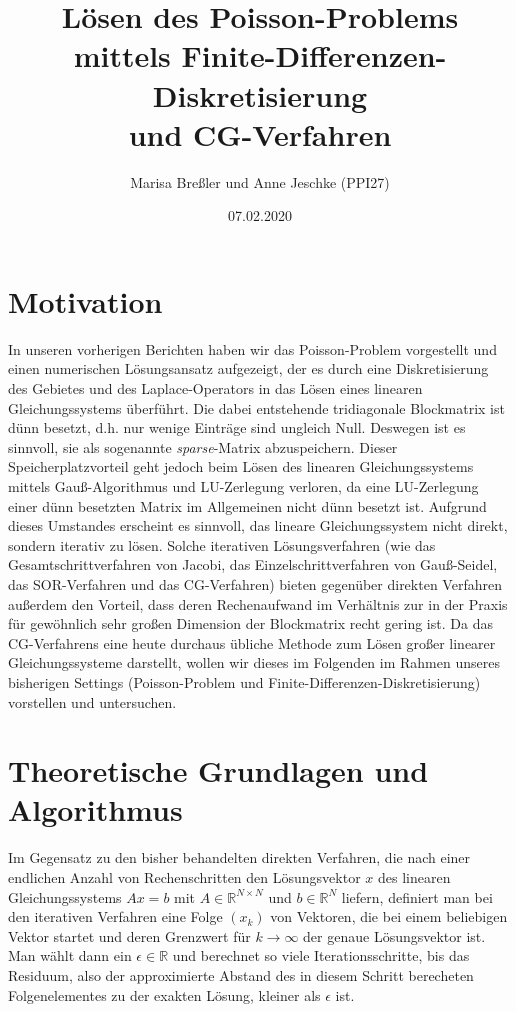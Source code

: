\documentclass{scrartcl}
\begin{document}
\title{Lösen des Poisson-Problems mittels Finite-Differenzen-Diskretisierung\\
und CG-Verfahren}
\author{Marisa Breßler und Anne Jeschke (PPI27)}
\date{07.02.2020}
\maketitle

\tableofcontents

\pagebreak
\section{Motivation}
In unseren vorherigen Berichten haben wir das Poisson-Problem vorgestellt und einen numerischen Lösungsansatz aufgezeigt, der es durch eine Diskretisierung des Gebietes und des Laplace-Operators in das Lösen eines linearen Gleichungssystems überführt.
Die dabei entstehende tridiagonale Blockmatrix ist dünn besetzt, d.h. nur wenige Einträge sind ungleich Null.
Deswegen ist es sinnvoll, sie als sogenannte \textit{sparse}-Matrix abzuspeichern.
Dieser Speicherplatzvorteil geht jedoch beim Lösen des linearen Gleichungssystems mittels Gauß-Algorithmus und LU-Zerlegung verloren, da eine LU-Zerlegung einer dünn besetzten Matrix im Allgemeinen nicht dünn besetzt ist.
Aufgrund dieses Umstandes erscheint es sinnvoll, das lineare Gleichungssystem nicht direkt, sondern iterativ zu lösen.
Solche iterativen Lösungsverfahren (wie das Gesamtschrittverfahren von Jacobi, das Einzelschrittverfahren von Gauß-Seidel, das SOR-Verfahren und das CG-Verfahren) bieten gegenüber direkten Verfahren außerdem den Vorteil, dass deren Rechenaufwand im Verhältnis zur in der Praxis für gewöhnlich sehr großen Dimension der Blockmatrix recht gering ist.
Da das CG-Verfahrens eine heute durchaus übliche Methode zum Lösen großer linearer Gleichungssysteme darstellt, wollen wir dieses im Folgenden im Rahmen unseres bisherigen Settings (Poisson-Problem und Finite-Differenzen-Diskretisierung) vorstellen und untersuchen.



\pagebreak
\section{Theoretische Grundlagen und Algorithmus}

Im Gegensatz zu den bisher behandelten direkten Verfahren, die nach einer endlichen Anzahl von Rechenschritten den Lösungsvektor $x$ des linearen Gleichungssystems $Ax=b$ mit $A\in\mathbb{R}^{N\times N}$ und $b\in\mathbb{R}^N$ liefern, definiert man bei den iterativen Verfahren eine Folge $(x_k)$ von Vektoren, die bei einem beliebigen Vektor startet und deren Grenzwert für $k \to \infty$ der genaue Lösungsvektor ist.
Man wählt dann ein $\epsilon\in\mathbb{R}$ und berechnet so viele Iterationsschritte, bis das Residuum, also der approximierte Abstand des in diesem Schritt berecheten Folgenelementes zu der exakten Lösung, kleiner als $\epsilon$ ist.
\end{document}
